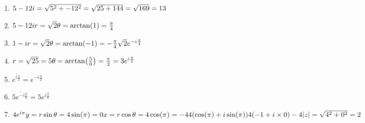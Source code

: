 \documentclass[a4paper]{article}
\begin{document}
\begin{enumerate}[1.]
        \item $5-12i
        =\sqrt{5^2 + -12^2}\\
        =\sqrt{25+144}\\
        =\sqrt{169}\\
        =13
        $

        \item $
        5-12i\\
        r = \sqrt{2}\\
        \theta = \arctan(1)\\
        =\frac{\pi}{4}
        $

        \item $1-i\\
        r = \sqrt{2}\\
        \theta = \arctan(-1)\\
        =-\frac{\pi}{4}\\
        \sqrt{2} e^{-i\frac{\pi}{4}}\\
        $

        \item $
        r = \sqrt{25} = 5\\
        \theta = \arctan(\frac{5}{0})\\
        =\frac{\pi}{2}\\
        =3e^{i\frac{\pi}{2}}
        $

        \item $
        \overline{e^{i\frac{\pi}{2}}} = e^{-i\frac{\pi}{2}}
        $

        \item $ \overline{5e^{-i\frac{\pi}{6}}}
        =5e^{i\frac{\pi}{6}}
        $

        \item $4e^{i\pi}\\
        y = r \sin \theta\\
        = 4 \sin(\pi)\\
        = 0\\
        \\
        x = r \cos \theta \\
        = 4 \cos(\pi)\\
        = -4\\
        \\
        4(\cos(\pi) + i \sin(\pi))\\
        4(-1 + i \times 0)\\
        -4\\
        \\
        \abs{z} = \sqrt{4^2 + 0^2}\\
        = 2
        $


\end{enumerate}
\end{document}
